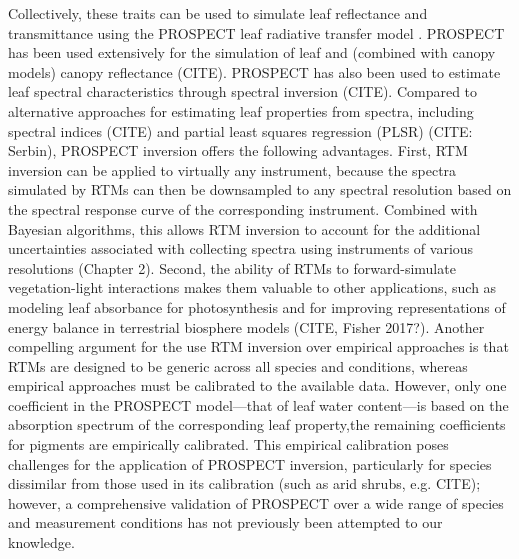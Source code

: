 Collectively, these traits can be used to simulate leaf reflectance and transmittance using the PROSPECT leaf radiative transfer model \cite{jacquemoud_1990_prospect,feret2008_prospect,feret2017_prospectd}.
PROSPECT has been used extensively for the simulation of leaf and (combined with canopy models) canopy reflectance (CITE).
PROSPECT has also been used to estimate leaf spectral characteristics through spectral inversion (CITE).
Compared to alternative approaches for estimating leaf properties from spectra, including spectral indices (CITE) and partial least squares regression (PLSR) \cite{barnes_2017_beyond} (CITE: Serbin), PROSPECT inversion offers the following advantages.
First, RTM inversion can be applied to virtually any instrument, because the spectra simulated by RTMs can then be downsampled to any spectral resolution based on the spectral response curve of the corresponding instrument.
Combined with Bayesian algorithms, this allows RTM inversion to account for the additional uncertainties associated with collecting spectra using instruments of various resolutions (Chapter 2).
Second, the ability of RTMs to forward-simulate vegetation-light interactions makes them valuable to other applications, such as modeling leaf absorbance for photosynthesis and for improving representations of energy balance in terrestrial biosphere models (CITE, Fisher 2017?).
Another compelling argument for the use RTM inversion over empirical approaches is that RTMs are designed to be generic across all species and conditions, whereas empirical approaches must be calibrated to the available data.
However, only one coefficient in the PROSPECT model---that of leaf water content---is based on the absorption spectrum of the corresponding leaf property,the remaining coefficients for pigments are empirically calibrated.
This empirical calibration poses challenges for the application of PROSPECT inversion, particularly for species dissimilar from those used in its calibration (such as arid shrubs, e.g. CITE); however, a comprehensive validation of PROSPECT over a wide range of species and measurement conditions has not previously been attempted to our knowledge.

